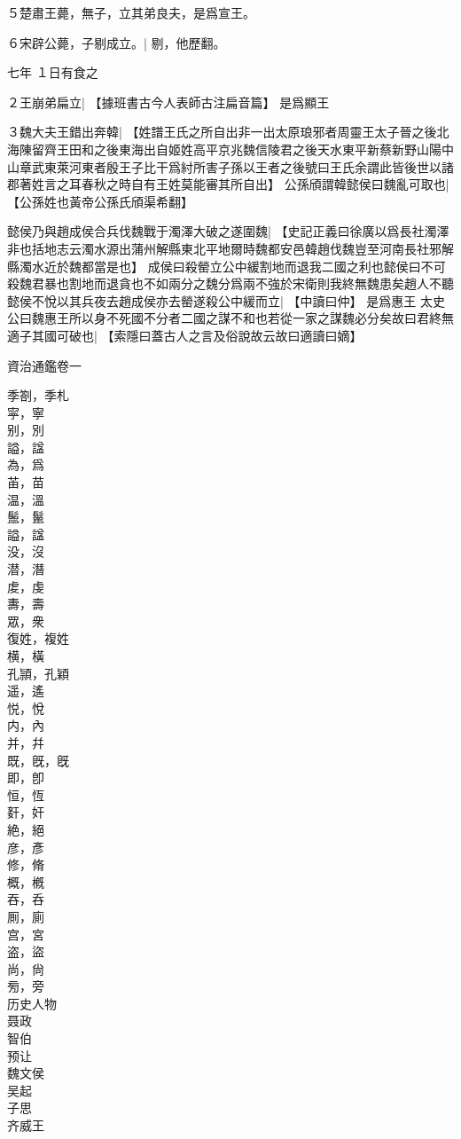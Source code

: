 ５楚肅王薨，無子，立其弟良夫，是爲宣王。

６宋辟公薨，子剔成立。|{
	剔，他歷翻。
	}



七年
１日有食之

２王崩弟扁立|{
	【據班書古今人表師古注扁音篇】
	}
是爲顯王

３魏大夫王錯出奔韓|{
	【姓譜王氏之所自出非一出太原琅邪者周靈王太子晉之後北海陳留齊王田和之後東海出自姬姓高平京兆魏信陵君之後天水東平新蔡新野山陽中山章武東萊河東者殷王子比干爲紂所害子孫以王者之後號曰王氏余謂此皆後世以諸郡著姓言之耳春秋之時自有王姓莫能審其所自出】
	}
公孫頎謂韓懿侯曰魏亂可取也|{
	【公孫姓也黃帝公孫氏頎渠希翻】
	}

懿侯乃與趙成侯合兵伐魏戰于濁澤大破之遂圍魏|{
	【史記正義曰徐廣以爲長社濁澤非也括地志云濁水源出蒲州解縣東北平地爾時魏都安邑韓趙伐魏豈至河南長社邪解縣濁水近於魏都當是也】
	}
成侯曰殺罃立公中緩割地而退我二國之利也懿侯曰不可殺魏君暴也割地而退貪也不如兩分之魏分爲兩不強於宋衛則我終無魏患矣趙人不聽懿侯不悅以其兵夜去趙成侯亦去罃遂殺公中緩而立|{
	【中讀曰仲】
	}
是爲惠王
太史公曰魏惠王所以身不死國不分者二國之謀不和也若從一家之謀魏必分矣故曰君終無適子其國可破也|{
	【索隱曰蓋古人之言及俗說故云故曰適讀曰嫡】
	}


資治通鑑卷一
\newpage


季劄，季札\\
寜，寧\\
别，別\\
謚，諡\\
為，爲\\
苖，苗\\
温，溫\\
鬛，鬣\\
謚，諡\\
没，沒\\
潜，潛\\
䖍，虔\\
夀，壽\\
眾，衆\\
復姓，複姓\\
横，橫\\
孔頴，孔穎\\
遥，遙\\
悦，悅\\
内，內\\
并，幷\\
既，旣，旣\\
即，卽\\
恒，恆\\
姧，奸\\
絶，絕\\
彦，彥\\
修，脩\\
概，槪\\
吞，呑\\
厠，廁\\
宫，宮\\
盗，盜\\
尚，尙\\
㫄，旁\\
历史人物\\

聂政\\
智伯\\
预让\\
魏文侯\\
吴起\\
子思\\
齐威王\\
